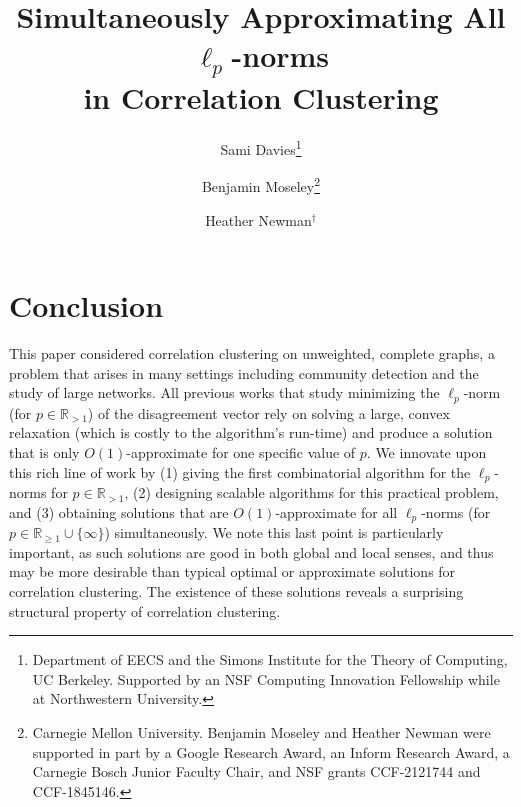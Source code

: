 \documentclass[11pt]{article}
\title{Simultaneously Approximating All $\ell_p$-norms\\ in Correlation Clustering }
\date{}
\author{Sami Davies\thanks{Department of EECS and the Simons Institute for the Theory of Computing, UC Berkeley. Supported by an NSF Computing Innovation Fellowship while at Northwestern University.} \and Benjamin Moseley\thanks{Carnegie Mellon University. Benjamin Moseley and Heather Newman were supported in part by  a Google Research Award, an Inform Research Award, a Carnegie Bosch Junior Faculty Chair, and NSF grants CCF-2121744  and  CCF-1845146.} \and Heather Newman$^\dagger$}
\begin{document}
\maketitle











\section{Conclusion}

This paper considered correlation clustering on unweighted, complete graphs, 
a problem that arises in many settings including community detection and the study of large networks.
All previous works that study minimizing the $\ell_p$-norm (for $p \in \mathbb{R}_{>1}$) of the disagreement vector rely on solving a large, convex relaxation (which is costly to the algorithm's run-time) and produce a solution that is only $O(1)$-approximate for one specific value of $p$. 
We innovate upon this rich line of work by 
(1) giving the first combinatorial algorithm for the $\ell_p$-norms for $p \in \mathbb{R}_{>1}$, 
(2) designing scalable algorithms for this practical problem, and 
(3) obtaining solutions that are $O(1)$-approximate for all $\ell_p$-norms (for $p \in \mathbb{R}_{\geq1} \cup \{\infty\}$) simultaneously.  
We note this last point is particularly important, 
as such solutions are good in both global and local senses, 
and thus may be more desirable than typical optimal or approximate solutions for correlation clustering. The existence of these solutions reveals a surprising structural property of correlation clustering.
\end{document}
